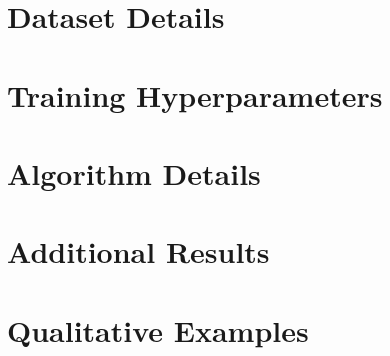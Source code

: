 \documentclass{article}
\begin{document}
\section{Dataset Details}
\label{app:data}

\section{Training Hyperparameters}
\label{app:hp}

\section{Algorithm Details}
\label{app:algo}

\section{Additional Results}
\label{app:results}

\section{Qualitative Examples}
\label{app:examples}


\end{document}
